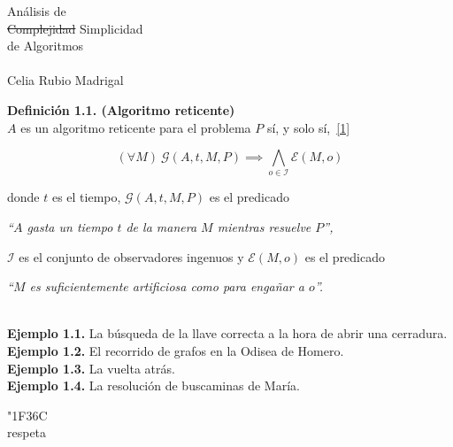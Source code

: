 \documentclass[plain]{beamer}
\newcommand{\soutt}[1]{%
	\renewcommand{\ULthickness}{2pt}%
	\sout{#1}%
	\renewcommand{\ULthickness}{.4pt}%
}
\newcommand{\ee}[1]{{\emojifont \char"#1{}}}
\begin{document}
\begin{frame}
\begin{center}	
	{\LARGE Análisis de\\
	\soutt{Complejidad} Simplicidad\\[5pt]
	de Algoritmos}\\[20pt]

	\resizebox{2cm}{1.25cm}{\ee{1F570}}\\[30pt]
 
	Celia Rubio Madrigal
\end{center}
\end{frame}

\begin{frame}
	
	\textbf{Definición 1.1. (Algoritmo reticente)}\\[20pt]
	
	$A$ es un algoritmo reticente para el problema $P$ sí, y solo sí,~\hyperlink{uno}{[1]}
	
	\[(\forall M)\ \mathcal{G}(A,t,M,P) \implies \bigwedge\limits_{o\in\mathcal{I}}\mathcal{E}(M,o)\]
	
	donde $t$ es el tiempo, $\mathcal{G}(A,t,M,P)$ es el predicado
	\begin{center}
		\it``$A$ gasta un tiempo $t$ de la manera $M$ mientras resuelve $P$'',
	\end{center}
	$\mathcal{I}$ es el conjunto de observadores ingenuos
	y $\mathcal{E}(M,o)$ es el predicado
	\begin{center}
		\it``$M$ es suficientemente artificiosa como para engañar a $o$''.
	\end{center}
\end{frame}

\begin{frame}
	\ \\[20pt]
	\textbf{Ejemplo 1.1.} La búsqueda de la llave correcta a la hora de abrir una cerradura.\\[15pt]
	
	\textbf{Ejemplo 1.2.} El recorrido de grafos en la Odisea de Homero.\\[15pt]
	
	\textbf{Ejemplo 1.3.} La vuelta atrás.\\[15pt]
	
	\textbf{Ejemplo 1.4.} La resolución de buscaminas de María.\\[15pt]

	\begin{center}
		\bigskip
		
		{\Huge\ee{1F36C}}\\
		{\color{white}respeta}
	\end{center}
\end{frame}
\end{document}

